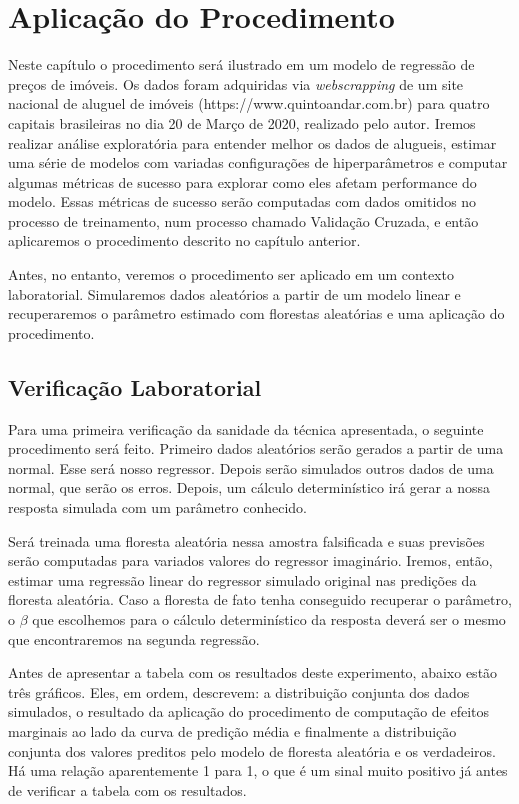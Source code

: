 

\chapter{Aplicação do Procedimento}

Neste capítulo o procedimento será ilustrado em um modelo de regressão de preços de imóveis. Os dados foram adquiridas via \textit{webscrapping} de um site nacional de aluguel de imóveis (https://www.quintoandar.com.br) para quatro capitais brasileiras no dia 20 de Março de 2020, realizado pelo autor. Iremos realizar análise exploratória para entender melhor os dados de alugueis, estimar uma série de modelos com variadas configurações de hiperparâmetros e computar algumas métricas de sucesso para explorar como eles afetam performance do modelo. Essas métricas de sucesso serão computadas com dados omitidos no processo de treinamento, num processo chamado Validação Cruzada, e então aplicaremos o procedimento descrito no capítulo anterior. 


Antes, no entanto, veremos o procedimento ser aplicado em um contexto laboratorial. Simularemos dados aleatórios a partir de um modelo linear e recuperaremos o parâmetro estimado com florestas aleatórias e uma aplicação do procedimento. 



\section{Verificação Laboratorial}

Para uma primeira verificação da sanidade da técnica apresentada, o seguinte procedimento será feito. Primeiro dados aleatórios serão gerados a partir de uma normal. Esse será nosso regressor. Depois serão simulados outros dados de uma normal, que serão os erros. Depois, um cálculo determinístico irá gerar a nossa resposta simulada com um parâmetro conhecido. 

Será treinada uma floresta aleatória nessa amostra falsificada e suas previsões serão computadas para variados valores do regressor imaginário. Iremos, então, estimar uma regressão linear do regressor simulado original nas predições da floresta aleatória. Caso a floresta de fato tenha conseguido recuperar o parâmetro, o $\beta$ que escolhemos para o cálculo determinístico da resposta deverá ser o mesmo que encontraremos na segunda regressão. 

Antes de apresentar a tabela com os resultados deste experimento, abaixo estão três gráficos. Eles, em ordem, descrevem: a distribuição conjunta dos dados simulados, o resultado da aplicação do procedimento de computação de efeitos marginais ao lado da curva de predição média e finalmente a distribuição conjunta dos valores preditos pelo modelo de floresta aleatória e os verdadeiros. Há uma relação aparentemente 1 para 1, o que é um sinal muito positivo já antes de verificar a tabela com os resultados.


